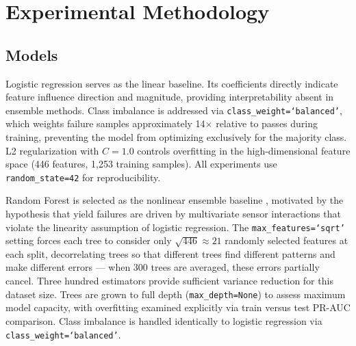 \documentclass[conference]{IEEEtran}
\begin{document}
\section{Experimental Methodology}

\subsection{Models}

Logistic regression serves as the linear baseline. Its coefficients directly indicate 
feature influence direction and magnitude, providing interpretability 
absent in ensemble methods. Class imbalance is addressed via 
\texttt{class\_weight=`balanced'}, which weights failure samples 
approximately 14$\times$ relative to passes during training, 
preventing the model from optimizing exclusively for the majority 
class. L2 regularization with $C=1.0$ controls overfitting in the 
high-dimensional feature space (446 features, 1,253 training 
samples). All experiments use \texttt{random\_state=42} for 
reproducibility.

Random Forest is selected as the nonlinear ensemble baseline 
\cite{breiman2001random}, motivated by the hypothesis that yield 
failures are driven by multivariate sensor interactions that 
violate the linearity assumption of logistic regression. The 
\texttt{max\_features=`sqrt'} setting forces each tree to consider 
only $\sqrt{446} \approx 21$ randomly selected features at each 
split, decorrelating trees so that different trees find different 
patterns and make different errors --- when 300 trees are averaged, 
these errors partially cancel. Three hundred estimators provide 
sufficient variance reduction for this dataset size. Trees are grown 
to full depth (\texttt{max\_depth=None}) to assess maximum model 
capacity, with overfitting examined explicitly via train versus test 
PR-AUC comparison. Class imbalance is handled identically to logistic 
regression via \texttt{class\_weight=`balanced'}.
\end{document}
